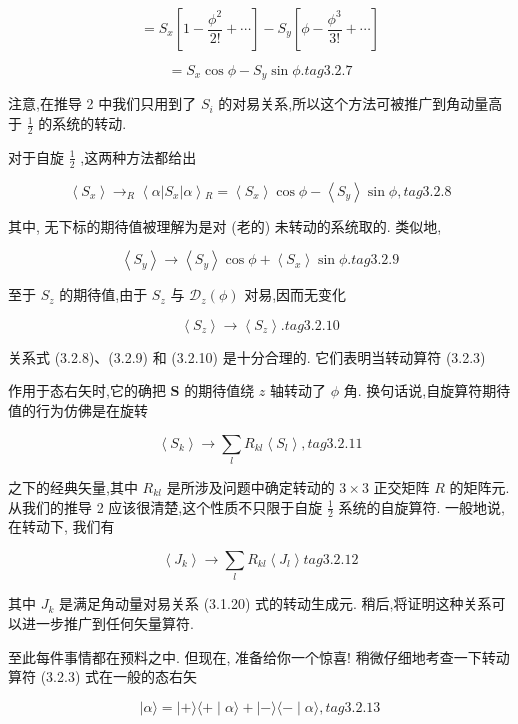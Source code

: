 $$
= {S}_{x}\left\lbrack {1 - \frac{{\phi }^{2}}{2!} + \cdots }\right\rbrack - {S}_{y}\left\lbrack {\phi - \frac{{\phi }^{3}}{3!} + \cdots }\right\rbrack
$$

$$
= {S}_{x}\cos \phi - {S}_{y}\sin \phi . tag{3.2.7}
$$

注意,在推导 2 中我们只用到了 ${S}_{i}$ 的对易关系,所以这个方法可被推广到角动量高于 $\frac{1}{2}$ 的系统的转动.

对于自旋 $\frac{1}{2}$ ,这两种方法都给出

$$
\left\langle {S}_{x}\right\rangle { \rightarrow }_{R}\left\langle {\alpha \left| {S}_{x}\right| \alpha }\right\rangle {}_{R} = \left\langle {S}_{x}\right\rangle \cos \phi - \left\langle {S}_{y}\right\rangle \sin \phi , tag{3.2.8}
$$

其中, 无下标的期待值被理解为是对 (老的) 未转动的系统取的. 类似地,

$$
\left\langle {S}_{y}\right\rangle \rightarrow \left\langle {S}_{y}\right\rangle \cos \phi + \left\langle {S}_{x}\right\rangle \sin \phi . tag{3.2.9}
$$

至于 ${S}_{z}$ 的期待值,由于 ${S}_{z}$ 与 ${\mathcal{D}}_{z}\left( \phi \right)$ 对易,因而无变化

$$
\left\langle {S}_{z}\right\rangle \rightarrow \left\langle {S}_{z}\right\rangle . tag{3. 2.10}
$$

关系式 (3.2.8)、(3.2.9) 和 (3.2.10) 是十分合理的. 它们表明当转动算符 (3.2.3)

作用于态右矢时,它的确把 $\mathbf{S}$ 的期待值绕 $z$ 轴转动了 $\phi$ 角. 换句话说,自旋算符期待值的行为仿佛是在旋转

$$
\left\langle {S}_{k}\right\rangle \rightarrow \mathop{\sum }\limits_{l}{R}_{kl}\left\langle {S}_{l}\right\rangle , tag{3.2.11}
$$

之下的经典矢量,其中 ${R}_{kl}$ 是所涉及问题中确定转动的 $3 \times 3$ 正交矩阵 $R$ 的矩阵元. 从我们的推导 2 应该很清楚,这个性质不只限于自旋 $\frac{1}{2}$ 系统的自旋算符. 一般地说,在转动下, 我们有

$$
\left\langle {J}_{k}\right\rangle \rightarrow \mathop{\sum }\limits_{l}{R}_{kl}\left\langle {J}_{l}\right\rangle tag{3.2.12}
$$

其中 ${J}_{k}$ 是满足角动量对易关系 (3.1.20) 式的转动生成元. 稍后,将证明这种关系可以进一步推广到任何矢量算符.

至此每件事情都在预料之中. 但现在, 准备给你一个惊喜! 稍微仔细地考查一下转动算符 (3.2.3) 式在一般的态右矢

$$
\left| {\alpha \rangle = }\right| + \rangle \langle + \mid \alpha \rangle + \mid - \rangle \langle - \mid \alpha \rangle , tag{3.2.13}
$$

